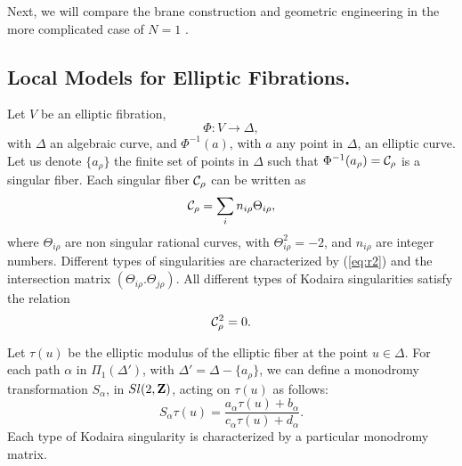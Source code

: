 Next, we will compare the brane construction and geometric
engineering in the more complicated case of $N=1$ \cite{KV,BJPSV}. 



\subsection{Local Models for Elliptic Fibrations.}
\label{sec:elliptic}


Let $V$ be an elliptic fibration,
\begin{equation}
\Phi: V \rightarrow \Delta,
\label{eq:r1}
\end{equation}
with $\Delta$ an algebraic curve, and $\Phi^{-1}(a)$, with $a$
any point in $\Delta$, an elliptic curve. Let us denote
$\{a_{\rho}\}$ the finite set of points in $\Delta$ such that
$\Phi^{-1}(a_{\rho})={\cal C}_{\rho}$ is a singular fiber. Each singular
fiber ${\cal C}_{\rho}$ can be written as
\begin{equation}
{\cal C}_{\rho} = \sum_i n_{i \rho} \Theta_{i \rho},
\label{eq:r2}
\end{equation}
where $\Theta_{i \rho}$ are non singular rational curves, with
$\Theta_{i \rho}^2 =-2$, and $n_{i \rho}$ are integer numbers.
Different types of singularities are characterized by
(\ref{eq:r2}) and the intersection matrix $(\Theta_{i \rho} .
\Theta_{j \rho})$. All different types of Kodaira singularities
satisfy the relation
\begin{equation}
{\cal C}_{\rho}^2=0.
\label{eq:r3}
\end{equation}
  
Let $\tau(u)$ be the elliptic modulus of the elliptic fiber at
the point $u \in \Delta$. For each path $\alpha$ in
$\Pi_1(\Delta')$, with $\Delta'= \Delta- \{a_{\rho}\}$, we can
define a monodromy transformation $S_{\alpha}$, in $Sl(2,{\bf
Z})$, acting on $\tau(u)$ as follows:
\begin{equation}
S_{\alpha} \tau(u) = \frac {a_{\alpha} \tau(u) +
b_{\alpha}}{c_{\alpha} \tau(u) + d_{\alpha}}.
\label{eq:r4}
\end{equation}
Each type of Kodaira singularity is characterized by a particular
monodromy matrix. 
  
